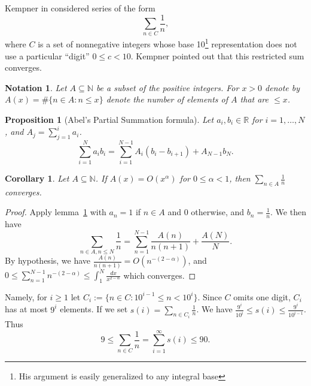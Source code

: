 \documentclass{article}
\newtheorem{corollary}[section]{Corollary}
\newtheorem{proposition}[section]{Proposition}
\newtheorem{notation}[section]{Notation}
\newcommand{\propref}[1]{lemma~\ref{prop:#1}}
\newcommand{\RR}{\mathbb{R}}
\newcommand{\NN}{\mathbb{N}}
\begin{document}
Kempner in \cite{kempner1914curious}
considered series of the form
\begin{displaymath}
  \sum_{n \in C} \frac{1}{n},
\end{displaymath}
where $C$ is a set of nonnegative integers whose base 10\footnote{His
  argument is easily generalized to any integral base}
representation does not use a particular ``digit'' $0 \le c <
10$. Kempner pointed out that this restricted sum converges.

\begin{notation}
  Let $A \subseteq \NN$ be a subset of the positive integers. For $x >
  0$ denote by $A(x) = \#\{n \in A: n \le x\}$ denote the number of
  elements of $A$ that are $\le x$.
\end{notation}
\begin{proposition}[Abel's Partial Summation formula]
\label{prop:partial}
  Let $a_i, b_i \in \RR$ for $i=1, \dots, N$, and $A_j = \sum_{j=1}^i a_i$.
  \begin{displaymath}
    \sum_{i=1}^N a_i b_i = \sum_{i=1}^{N-1} A_i (b_i - b_{i+1}) +
    A_{N-1}b_N.
  \end{displaymath}
\end{proposition}
\begin{corollary}
  Let $A \subseteq \NN$. If $A(x) = O(x^\alpha)$ for $0 \le \alpha <
  1$, then $\sum_{n \in A}\frac{1}{n}$ converges.
\end{corollary}
\begin{proof}
  Apply \propref{partial} with $a_n = 1$ if $n \in A$ and 0 otherwise,
  and $b_n = \frac{1}{n}$. We then have
  \begin{displaymath}
    \sum_{n \in A, n \le N}\frac{1}{n} = \sum_{n=1}^{N-1}
    \frac{A(n)}{n(n+1)} + \frac{A(N)}{N}.
  \end{displaymath}
  By hypothesis, we have $\frac{A(n)}{n(n+1)} = O(n^{- (2 - \alpha)})$,
  and $0 \le \sum_{n=1}^{N-1} n^{- (2 - \alpha)} \le \int_1^N
  \frac{dx}{x^{2-\alpha}}$ which converges.
\end{proof}

Namely,
for $i \ge 1$ let $C_i := \{n \in C: 10^{i-1} \le n < 10^i\}$. Since
$C$ omits one digit, $C_i$ has at most $9^i$ elements. If we set
$s(i) = \sum_{n \in C_i} \frac{1}{n}$. We have
$\frac{9^i}{10^i} \le s(i) \le \frac{9^i}{10^{i-1}}$. Thus
\begin{displaymath}
  9 \le \sum_{n \in C} \frac{1}{n} = \sum_{i=1}^\infty s(i) \le 90.
\end{displaymath}
\end{document}
